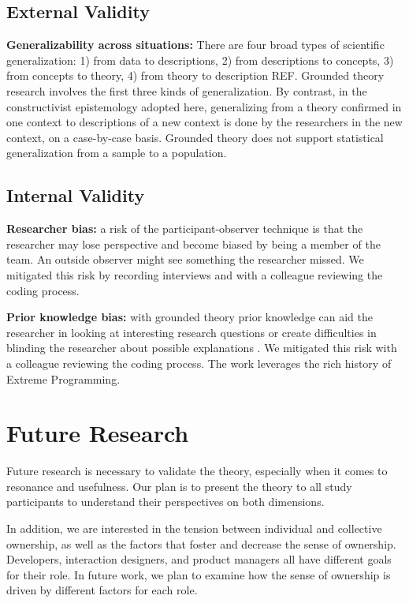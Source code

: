 \begin{table}[]
\subsection{External Validity}

\textbf{Generalizability across situations:} There are four broad types of scientific generalization: 1) from data to descriptions, 2) from descriptions to concepts, 3) from concepts to theory, 4) from theory to description REF. Grounded theory research involves the first three kinds of generalization. By contrast, in the constructivist epistemology adopted here, generalizing from a theory confirmed in one context to descriptions of a new context is done by the researchers in the new context, on a case-by-case basis. Grounded theory does not support statistical generalization from a sample to a population.

\subsection{Internal Validity}
\textbf{Researcher bias:} a risk of the participant-observer technique is that the researcher may lose perspective and become biased by being a member of the team. An outside observer might see something the researcher missed. We mitigated this risk by recording interviews and with a colleague reviewing the coding process.

\textbf{Prior knowledge bias:} with grounded theory prior knowledge can aid the researcher in looking at interesting research questions or create difficulties in blinding the researcher about possible explanations \cite{GlaserIssues}. We mitigated this risk with a colleague reviewing the coding process. The work leverages the rich history of Extreme Programming.
\section{Future Research}
Future research is necessary to validate the theory, especially when it comes to resonance and usefulness. Our plan is to present the theory to all study participants to understand their perspectives on both dimensions. 

In addition, we are interested in the tension between individual and collective ownership, as well as the factors that foster and decrease the sense of ownership. Developers, interaction designers, and product managers all have different goals for their role. In future work, we plan to examine how the sense of ownership is driven by different factors for each role.


\end{table}
